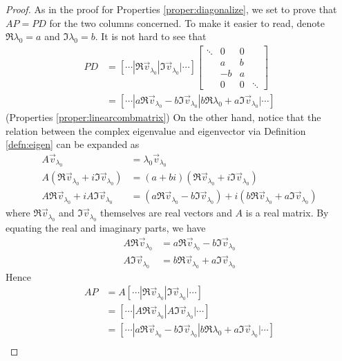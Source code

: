 \begin{proof}
As in the proof for Properties \ref{proper:diagonalize}, we set to prove that $AP = PD$ for the two columns concerned. To make it easier to read, denote $\Re{\lambda_0} = a$ and $\Im{\lambda_0} = b$. It is not hard to see that
\begin{align*}
PD &=
[\cdots|\Re{\vec{v}_{\lambda_0}}|\Im{\vec{v}_{\lambda_0}}|\cdots]
\begin{bmatrix}
\ddots & 0 & 0 & \\
& a & b & \\
& -b & a & \\
& 0 & 0 & \ddots
\end{bmatrix} \\
&= [\cdots|a\Re{\vec{v}_{\lambda_0}} - b\Im{\vec{v}_{\lambda_0}} | b\Re{\lambda_0} + a\Im{\vec{v}_{\lambda_0}}|\cdots]
\end{align*}
(Properties \ref{proper:linearcombmatrix}) On the other hand, notice that the relation between the complex eigenvalue and eigenvector via Definition \ref{defn:eigen} can be expanded as
\begin{align*}
A\vec{v}_{\lambda_0} &= \lambda_0\vec{v}_{\lambda_0} \\
A(\Re{\vec{v}_{\lambda_0}} + i \Im{\vec{v}_{\lambda_0}}) &= (a+bi)(\Re{\vec{v}_{\lambda_0}} + i \Im{\vec{v}_{\lambda_0}}) \\
A\Re{\vec{v}_{\lambda_0}} + i A\Im{\vec{v}_{\lambda_0}} &= (a\Re{\vec{v}_{\lambda_0}} - b\Im{\vec{v}_{\lambda_0}}) + i(b\Re{\vec{v}_{\lambda_0}} + a\Im{\vec{v}_{\lambda_0}})
\end{align*}
where $\Re{\vec{v}_{\lambda_0}}$ and $\Im{\vec{v}_{\lambda_0}}$ themselves are real vectors and $A$ is a real matrix. By equating the real and imaginary parts, we have
\begin{subequations}
\begin{align}
A\Re{\vec{v}_{\lambda_0}} &= a\Re{\vec{v}_{\lambda_0}} - b\Im{\vec{v}_{\lambda_0}} \label{eqn:realmodiag} \\
A\Im{\vec{v}_{\lambda_0}} &= b\Re{\vec{v}_{\lambda_0}} + a\Im{\vec{v}_{\lambda_0}}
\label{eqn:imgmodiag}
\end{align}
\end{subequations}
Hence
\begin{align*}
AP &= A[\cdots|\Re{\vec{v}_{\lambda_0}}|\Im{\vec{v}_{\lambda_0}}|\cdots] \\
&= [\cdots|A\Re{\vec{v}_{\lambda_0}}|A\Im{\vec{v}_{\lambda_0}}|\cdots] \\
&= [\cdots|a\Re{\vec{v}_{\lambda_0}} - b\Im{\vec{v}_{\lambda_0}} | b\Re{\lambda_0} + a\Im{\vec{v}_{\lambda_0}}|\cdots] \\

\end{align*}
\end{proof}
